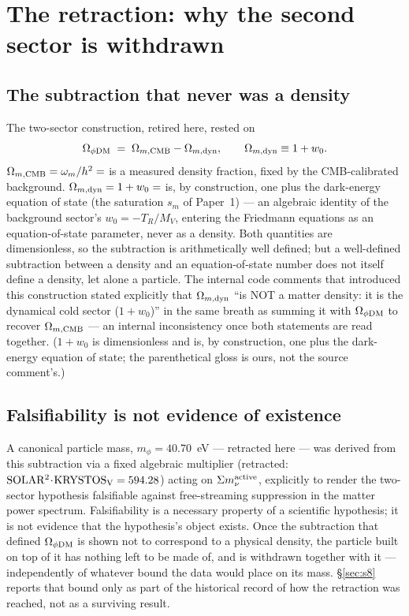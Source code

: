 \documentclass[12pt,a4paper]{article}
\begin{document}
\section{The retraction: why the second sector is withdrawn}
\label{sec:retraction}

\subsection{The subtraction that never was a density}

The two-sector construction, retired here, rested on
\begin{equation}
  \Omega_{\phi\rm DM} \;=\; \Omega_{m,\rm CMB} - \Omega_{m,\rm dyn},
  \qquad \Omega_{m,\rm dyn}\equiv 1+w_0.
\end{equation}
$\Omega_{m,\rm CMB}=\omega_m/h^2=\val{OMEGA_M_TOTAL_d6}$ is a measured density fraction, fixed
by the CMB-calibrated background. $\Omega_{m,\rm dyn}=1+w_0=\val{S_M_d6}$ is,
by construction, one plus the dark-energy equation of state (the saturation
$s_m$ of Paper~1) --- an algebraic
identity of the background sector's $w_0=-T_R/M_V$, entering the Friedmann
equations as an equation-of-state parameter, never as a density. Both
quantities are dimensionless, so the subtraction is arithmetically well
defined; but a well-defined subtraction between a density and an
equation-of-state number does not itself define a density, let alone a
particle. The internal code comments that introduced this construction stated
explicitly that $\Omega_{m,\rm dyn}$ ``is NOT a matter density: it is the
dynamical cold sector ($1+w_0$)'' in the same breath as summing it
with $\Omega_{\phi\rm DM}$ to recover $\Omega_{m,\rm CMB}$ --- an internal
inconsistency once both statements are read together. ($1+w_0$ is
dimensionless and is, by construction, one plus the dark-energy equation of
state; the parenthetical gloss is ours, not the source comment's.)

\subsection{Falsifiability is not evidence of existence}

A canonical particle mass, $m_\phi=40.70$~eV --- retracted here --- was
derived from this subtraction via a fixed algebraic multiplier
(retracted: $\rm SOLAR^2\!\cdot\!KRYSTOS_V=594.28$) acting on $\Sigma m_\nu^{\rm active}$,
explicitly to render the two-sector hypothesis falsifiable against
free-streaming suppression in the matter power spectrum. Falsifiability is a
necessary property of a scientific hypothesis; it is not evidence that the
hypothesis's object exists. Once the subtraction that defined
$\Omega_{\phi\rm DM}$ is shown not to correspond to a physical density, the
particle built on top of it has nothing left to be made of, and is withdrawn
together with it --- independently of whatever bound the data would place on
its mass. \S\ref{sec:s8} reports that bound only as part of the historical
record of how the retraction was reached, not as a surviving result.
\end{document}
